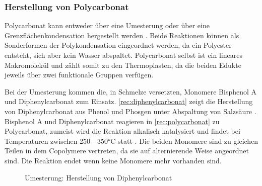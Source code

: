 \subsubsection{Herstellung von Polycarbonat}

Polycarbonat kann entweder über eine Umesterung oder über eine
Grenzflächenkondensation hergestellt werden \cite{cuzpe}. Beide Reaktionen
können als Sonderformen der Polykondensation eingeordnet werden, da ein
Polyester entsteht, sich aber kein Wasser abspaltet. Polycarbonat selbst ist ein
lineares Makromolekül und zählt somit zu den Thermoplasten, da die beiden Edukte
jeweils über zwei funktionale Gruppen verfügen.

Bei der Umesterung kommen die, in Schmelze versetzten, Monomere Bisphenol A und
Diphenylcarbonat zum Einsatz. \autoref{rec:diphenylcarbonat} zeigt die
Herstellung von Diphenylcarbonat aus Phenol und Phosgen unter Abspaltung von
Salzsäure \cite{cuzpe}. Bisphenol A und Diphenylcarbonat reagieren in
\autoref{rec:polycarbonat} zu Polycarbonat, zumeist wird die Reaktion alkalisch
katalysiert und findet bei Temperaturen zwischen 250 - 350°C statt \cite{pop}.
Die beiden Monomere sind zu gleichen Teilen in dem Copolymere vertreten, da sie
auf alternierende Weise angeordnet sind. Die Reaktion endet wenn keine Monomere
mehr vorhanden sind.

\begin{figure}[H]
    \begin{center}
        \footnotesize
        \setatomsep{1.7em}

        \chemsign{+}
        \chemrel{->}
        \chemsign{+}

        \caption{Umesterung: Herstellung von Diphenylcarbonat}
        \label{rec:diphenylcarbonat}
    \end{center}
\end{figure}


